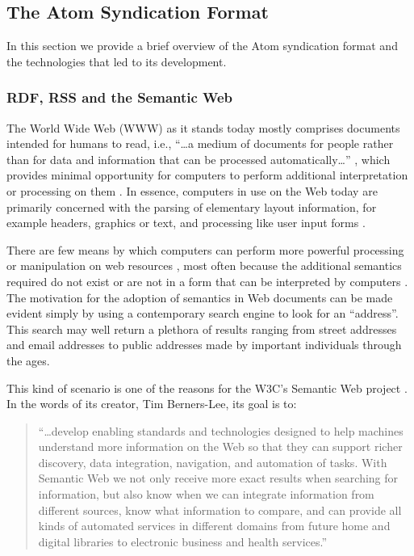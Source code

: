 \documentclass{CRPITStyle}
\begin{document}
\subsection{The Atom Syndication Format}
\label{sec-atom-overview}

In this section we provide a brief overview of the Atom syndication
format and the technologies that led to its development.


\subsubsection{RDF, RSS and the Semantic Web}
\label{sec-rdf-rss}

The World Wide Web (WWW) as it stands today mostly comprises documents
intended for humans to read, i.e., ``\ldots{}a medium of documents for
people rather than for data and information that can be processed
automatically\ldots'' \cite{Bern-T-2001-SciAm}, which provides minimal
opportunity for computers to perform additional interpretation or
processing on them \cite{Bern-T-1999-WWW,Bern-T-2001-SciAm}. In essence,
computers in use on the Web today are primarily concerned with the
parsing of elementary layout information, for example headers, graphics
or text, and processing like user input forms
\cite{Bern-T-1999-W3C,Bern-T-2001-SciAm}.

There are few means by which computers can perform more powerful
processing or manipulation on web resources
\cite{Bern-T-2001-SciAm,Fens-D-2003}, most often because the additional
semantics required do not exist or are not in a form that can be
interpreted by computers \cite{Koiv-MR-2001-W3C}. The motivation for the
adoption of semantics in Web documents can be made evident simply by
using a contemporary search engine to look for an ``address''. This
search may well return a plethora of results ranging from street
addresses and email addresses to public addresses made by important
individuals through the ages.

This kind of scenario is one of the reasons for the W3C's Semantic Web
project \cite{Koiv-MR-2001-W3C}. In the words of its creator, Tim
Berners-Lee, its goal is to:

\begin{quotation}
	``\ldots{}develop enabling standards and technologies designed to help
	machines understand more information on the Web so that they can
	support richer discovery, data integration, navigation, and
	automation of tasks. With Semantic Web we not only receive more
	exact results when searching for information, but also know when we
	can integrate information from different sources, know what
	information to compare, and can provide all kinds of automated
	services in different domains from future home and digital libraries
	to electronic business and health services.'' \cite{Koiv-MR-2001-W3C}
\end{quotation}
\end{document}
